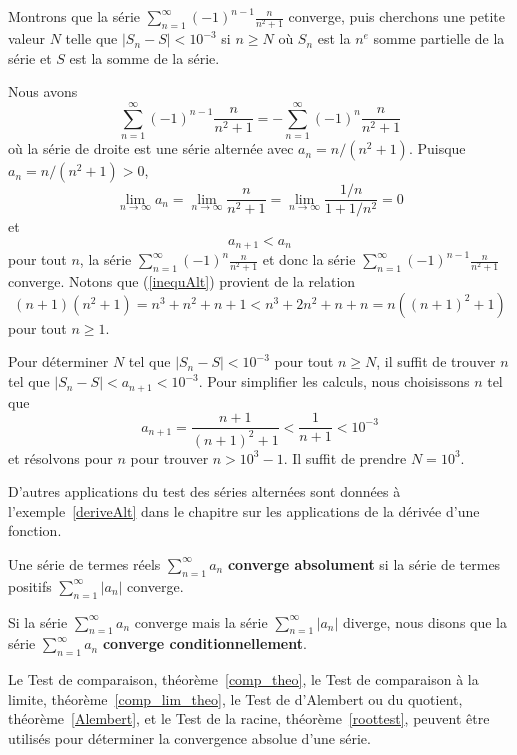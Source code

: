 {\begin{egg}
Montrons que la série
$\displaystyle \sum_{n=1}^\infty (-1)^{n-1}\frac{n}{n^2+1}$ converge,
puis cherchons une petite valeur $N$ telle que
$|S_n - S|< 10^{-3}$ si $n\geq N$ où $S_n$ est la $n^e$ somme
partielle de la série et $S$ est la somme de la série.

Nous avons
\[
\sum_{n=1}^\infty (-1)^{n-1}\frac{n}{n^2+1} =
-\sum_{n=1}^\infty (-1)^n\frac{n}{n^2+1}
\]
où la série de droite est une série alternée avec $a_n = n/(n^2+1)$.
Puisque $a_n = n/(n^2+1) >0$,
\[
\lim_{n\rightarrow \infty} a_n =
\lim_{n\rightarrow \infty} \frac{n}{n^2+1} =
\lim_{n\rightarrow \infty} \frac{1/n}{1+1/n^2} = 0
\]
et
\begin{equation}\label{inequAlt}
a_{n+1} < a_n
\end{equation}
pour tout $n$, la série
$\displaystyle \sum_{n=1}^\infty (-1)^n\frac{n}{n^2+1}$ et
donc la série
$\displaystyle \sum_{n=1}^\infty (-1)^{n-1}\frac{n}{n^2+1}$ converge.
Notons que (\ref{inequAlt}) provient de la relation
\[
(n+1)(n^2+1) = n^3 + n^2 + n + 1 < n^3 +2n^2 + n + n = n( (n+1)^2+1)
\]
pour tout $n\geq 1$.

Pour déterminer $N$ tel que $|S_n - S |<10^{-3}$ pour tout $n\geq N$,
il suffit de trouver $n$ tel que $|S_n - S |< a_{n+1} < 10^{-3}$.
Pour simplifier les calculs, nous choisissons $n$ tel que
\[
a_{n+1} = \frac{n+1}{(n+1)^2+1} < \frac{1}{n+1} < 10^{-3}
\]
et résolvons pour $n$ pour trouver $n > 10^3-1$.  Il suffit de
prendre $N=10^3$.
\end{egg}

D'autres applications du test des séries alternées sont données à
l'exemple~\ref{deriveAlt} dans le chapitre sur les applications de la
dérivée d'une fonction.

\begin{focus}{\dfn}
Une série de termes réels $\displaystyle \sum_{n=1}^\infty a_n$
{\bfseries converge absolument}
si la série de termes positifs $\displaystyle \sum_{n=1}^\infty |a_n|$
converge.

Si la série $\displaystyle \sum_{n=1}^\infty a_n$ converge mais la
série $\displaystyle \sum_{n=1}^\infty |a_n|$ diverge, nous disons que la
série $\displaystyle \sum_{n=1}^\infty a_n$
{\bfseries converge conditionnellement}.
\end{focus}

\begin{rmk}
Le Test de comparaison, théorème~\ref{comp_theo},
le Test de comparaison à la limite, théorème~\ref{comp_lim_theo},   
le Test de d'Alembert ou du quotient, théorème~\ref{Alembert}, et le
Test de la racine, théorème~\ref{roottest}, peuvent être utilisés pour
déterminer la convergence absolue d'une série.
\end{rmk}

}
